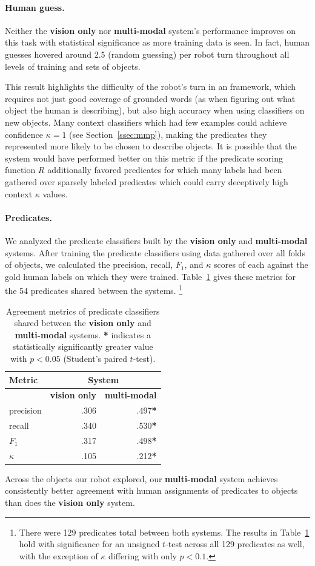 \paragraph{Human guess.}
Neither the \textbf{vision only} nor \textbf{multi-modal} system's performance improves on this task with statistical significance as more training data is seen.
In fact, human guesses hovered around 2.5 (random guessing) per robot turn throughout all levels of training and sets of objects.

This result highlights the difficulty of the robot's turn in an \ispy framework, which requires not just good coverage of grounded words (as when figuring out what object the human is describing), but also high accuracy when using classifiers on new objects.
Many context classifiers which had few examples could achieve confidence $\kappa=1$ (see Section~\ref{ssec:mmp}), making the predicates they represented more likely to be chosen to describe objects.
It is possible that the system would have performed better on this metric if the predicate scoring function $R$ additionally favored predicates for which many labels had been gathered over sparsely labeled predicates which could carry deceptively high context $\kappa$ values.

\paragraph{Predicates.}
We analyzed the predicate classifiers built by the \textbf{vision only} and \textbf{multi-modal} systems.
After training the predicate classifiers using data gathered over all folds of objects, we calculated the precision, recall, $F_1$, and $\kappa$ scores of each against the gold human labels on which they were trained.
Table~\ref{tab:predicate_results} gives these metrics for the 54 predicates shared between the systems.
\footnote{There were 129 predicates total between both systems.
The results in Table~\ref{tab:predicate_results} hold with significance for an unsigned $t$-test across all 129 predicates as well, with the exception of $\kappa$ differing with only $p<0.1$.}

\begin{table}
\centering
\begin{tabular}[h]{|l|r|r|}
	\hline
	\bf Metric & \multicolumn{2}{c|}{\bf System} \\ \hline \hline
	& \bf vision only & \bf multi-modal \\ \hline
	precision & .306 & .497\textbf{*} \\
	recall & .340 & .530\textbf{*} \\
	\bf $F_1$ & .317 & .498\textbf{*} \\
	\bf $\kappa$ & .105 & .212\textbf{*} \\ \hline
\end{tabular}
\caption{Agreement metrics of predicate classifiers shared between the \textbf{vision only} and \textbf{multi-modal} systems.
\textbf{*} indicates a statistically significantly greater value with $p<0.05$ (Student's paired $t$-test).}
\label{tab:predicate_results}
\end{table}

Across the objects our robot explored, our \textbf{multi-modal} system achieves consistently better agreement with human assignments of predicates to objects than does the \textbf{vision only} system.
